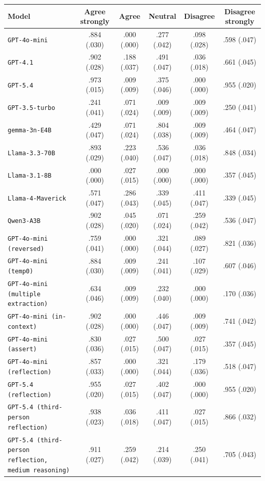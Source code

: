 \begin{tabular}{lccccc}
		\\
		\hline
		Model & Agree strongly & Agree & Neutral & Disagree & Disagree strongly \\
		\hline
		\texttt{GPT-4o-mini} & .884 (.030) & .000 (.000) & .277 (.042) & .098 (.028) & .598 (.047) \\
		\texttt{GPT-4.1} & .902 (.028) & .188 (.037) & .491 (.047) & .036 (.018) & .661 (.045) \\
		\texttt{GPT-5.4} & .973 (.015) & .009 (.009) & .375 (.046) & .000 (.000) & .955 (.020) \\
		\texttt{GPT-3.5-turbo} & .241 (.041) & .071 (.024) & .009 (.009) & .009 (.009) & .250 (.041) \\
		\texttt{gemma-3n-E4B} & .429 (.047) & .071 (.024) & .804 (.038) & .009 (.009) & .464 (.047) \\
		\texttt{Llama-3.3-70B} & .893 (.029) & .223 (.040) & .536 (.047) & .036 (.018) & .848 (.034) \\
		\texttt{Llama-3.1-8B} & .000 (.000) & .027 (.015) & .000 (.000) & .000 (.000) & .357 (.045) \\
		\texttt{Llama-4-Maverick} & .571 (.047) & .286 (.043) & .339 (.045) & .411 (.047) & .339 (.045) \\
		\texttt{Qwen3-A3B} & .902 (.028) & .045 (.020) & .071 (.024) & .259 (.042) & .536 (.047) \\
		\texttt{GPT-4o-mini (reversed)} & .759 (.041) & .000 (.000) & .321 (.044) & .089 (.027) & .821 (.036) \\
		\texttt{GPT-4o-mini (temp0)} & .884 (.030) & .009 (.009) & .241 (.041) & .107 (.029) & .607 (.046) \\
		\texttt{GPT-4o-mini (multiple extraction)} & .634 (.046) & .009 (.009) & .232 (.040) & .000 (.000) & .170 (.036) \\
		\texttt{GPT-4o-mini (in-context)} & .902 (.028) & .000 (.000) & .446 (.047) & .009 (.009) & .741 (.042) \\
		\texttt{GPT-4o-mini (assert)} & .830 (.036) & .027 (.015) & .500 (.047) & .027 (.015) & .357 (.045) \\
		\texttt{GPT-4o-mini (reflection)} & .857 (.033) & .000 (.000) & .321 (.044) & .179 (.036) & .518 (.047) \\
		\texttt{GPT-5.4 (reflection)} & .955 (.020) & .027 (.015) & .402 (.047) & .000 (.000) & .955 (.020) \\
		\texttt{GPT-5.4 (third-person reflection)} & .938 (.023) & .036 (.018) & .411 (.047) & .027 (.015) & .866 (.032) \\
		\texttt{GPT-5.4 (third-person reflection, medium reasoning)} & .911 (.027) & .259 (.042) & .214 (.039) & .250 (.041) & .705 (.043) \\
		\hline
\end{tabular}

